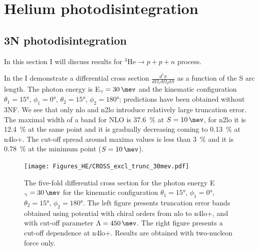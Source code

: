\clearpage

\section{Helium photodisintegration}
\label{sec:hel_results}

\subsection{3N photodisintegration}
\label{sec:hel_3N}

    In this section I will discuss results
    for $^3\text{He} \rightarrow p + p + n$ process.
    
    In the  I demonstrate a differential cross section 
    $\frac{d^5\sigma}{d\Omega_1d\Omega_2dS}$ as a function of the S arc length.
    The photon energy is  E$_\gamma=\SI{30}{\mev}$ and the kinematic configuration
    $\theta_1 = \ang{15}$, $\phi_1 = \ang{0}$,
    $\theta_2 = \ang{15}$, $\phi_2 = \ang{180}$; predictions have been obtained without 3NF.
    We see that only \gls{nlo} and \gls{n2lo} introduce relatively large truncation error.
    The maximal width of a band for NLO is \SI{37.6}{\percent} at $S=\SI{10}{\mev}$,
    for \gls{n2lo} it is \SI{12.4}{\percent} at the same point and it is gradually decreasing
    coming to \SI{0.13}{\percent} at \gls{n4lo+}.
    The cut-off spread around maxima values is less than \SI{3}{\percent} and it is
    \SI{0.78}{\percent} at the minimum point ($S=\SI{10}{\mev}$).
    

    \begin{figure}[h]
        \begin{center}
            \texttt{[image: Figures\_HE/CROSS\_excl\_trunc\_30mev.pdf]}
            \end{center}
            \caption{The five-fold differential cross section for the photon 
            energy E$_\gamma=\SI{30}{\mev}$ for the kinematic configuration
            $\theta_1 = \ang{15}$, $\phi_1 = \ang{0}$,
            $\theta_2 = \ang{15}$, $\phi_2 = \ang{180}$.
            The left figure presents truncation error bands obtained using potential
            with chiral orders from \gls{nlo} to \gls{n4lo+}, and with
            cut-off parameter $\Lambda=\SI{450}{\mev}$.
            The right figure presents a cut-off dependence at \gls{n4lo+}.
            Results are obtained with two-nucleon force only.}
            \label{CROSS_HE_EXCL_30}
        \end{figure}

